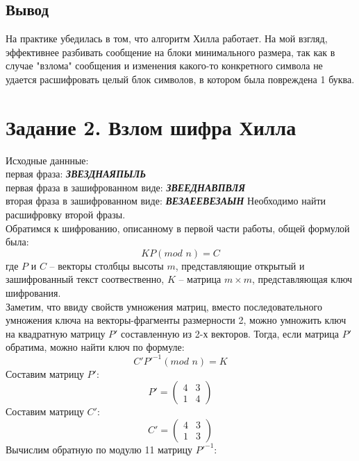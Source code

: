 \documentclass[a5paper, 10pt]{article}
\theoremstyle{definition}
\theoremstyle{plain}
\theoremstyle{remark}
\begin{document}
\subsection{Вывод}
На практике убедилась в том, что алгоритм Хилла работает. На мой взгляд, эффективнее разбивать сообщение на блоки минимального размера, так как в случае "взлома" сообщения и изменения какого-то конкретного символа не удается расшифровать целый блок символов, в котором была повреждена 1 буква.

\section{Задание 2. Взлом шифра Хилла}	
Исходные даннные: \\
первая фраза: \textbf{\textit{ЗВЕЗДНАЯПЫЛЬ}}\\
первая фраза в зашифрованном виде:  \textbf{\textit{ЗВЕЕДНАВПВЛЯ}}\\
вторая фраза в зашифрованном виде: \textbf{\textit{ВЕЗАЕЕВЕЗАЫН}}
Необходимо найти расшифровку второй фразы.\\
Обратимся к шифрованию, описанному в первой части работы, общей формулой была:
\begin{equation}
K P (mod \textit{ n}) = C
\end{equation}
где  $P$ и $C$ -- векторы столбцы высоты $m$, представляющие открытый и зашифрованный текст соотвественно, $K$ -- матрица  $m \times m$, представляющая ключ шифрования.\\
Заметим, что ввиду свойств умножения матриц, вместо последовательного умножения ключа на векторы-фрагменты размерности 2, можно умножить ключ на квадратную матрицу $P'$ составленную из 2-х векторов. Тогда, если матрица $P'$ обратима, можно найти ключ по формуле:
\begin{equation}
C' P'^{-1} (mod \textit{ n}) = K
\end{equation}
Составим матрицу $P'$:
\begin{equation}
P' =
\begin{pmatrix}
4 & 3\\
1 & 4
\end{pmatrix} 
\end{equation}
Составим матрицу $C'$:
\begin{equation}
C' =
\begin{pmatrix}
4 & 3\\
1 & 3
\end{pmatrix} 
\end{equation}
Вычислим обратную по модулю 11 матрицу $P'^{-1}$:
\end{document}

